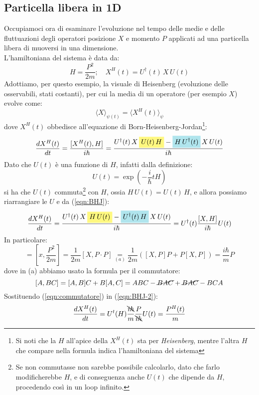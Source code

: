 \documentclass[../../FisicaTeorica.tex]{subfiles}
\begin{document}
\subsection{Particella libera in 1D}
Occupiamoci ora di esaminare l'evoluzione nel tempo delle medie e delle fluttuazioni degli operatori posizione $X$ e momento $P$ applicati ad una particella libera di muoversi in una dimensione.\\
L'hamiltoniana del sistema è data da:
\[
H=\frac{P^2}{2m};\quad X^H(t)=U^\dag(t)\,X\,U(t)
\]
Adottiamo, per questo esempio, la visuale di Heisenberg (evoluzione delle osservabili, stati costanti), per cui la media di un operatore (per esempio $X$) evolve come:
\[
\langle X \rangle_{\psi(t)}=\langle X^H(t)\rangle_\psi
\]
dove $X^H(t)$ obbedisce all'equazione di Born-Heisenberg-Jordan\footnote{Si noti che la $H$ all'apice della $X^H(t)$ sta per \textit{Heisenberg}, mentre l'altra $H$ che compare nella formula indica l'hamiltoniana del sistema}:
\begin{equation}
\frac{dX^H(t)}{dt}=\frac{[X^H(t),H]}{i\hbar} =
\frac{
U^\dag(t)\,X\,\hlc{Yellow}{U(t)\,H}-\hlc{SkyBlue}{H\,U^\dag(t)}\,X\,U(t)
}{i\hbar}
\label{eqn:BHJ}
\end{equation}
Dato che $U(t)$ è una funzione di $H$, infatti dalla definizione:
\[
U(t)=\exp\left(-\frac{i}{\hbar}tH\right)
\]
si ha che $U(t)$ commuta\footnote{Se non commutasse non sarebbe possibile calcolarlo, dato che farlo modificherebbe $H$, e di conseguenza anche $U(t)$ che dipende da $H$, procedendo così in un loop infinito.} con $H$, ossia $H\,U(t)=U(t)\,H$, e allora possiamo riarrangiare le $U$ e  da (\ref{eqn:BHJ}):
\begin{equation}
\frac{dX^H(t)}{dt}=\frac{U^\dag(t)\,X\,\hlc{Yellow}{H\,U(t)}-\hlc{SkyBlue}{U^\dag(t)\,H}\,X\,U(t)}{i\hbar} 
=U^\dag(t) \frac{[X,H]}{i\hbar}U(t)
\label{eqn:BHJ-2}
\end{equation}
In particolare:
\begin{equation}
[X,H]=\left[x,\frac{P^2}{2m}\right] = \frac{1}{2m}[X,P\cdot P]\underset{(a)}{=}\frac{1}{2m}([X,P]P+P[X,P])=\frac{i\hbar}{m}P
\label{eqn:commutatore}
\end{equation}
dove in (a) abbiamo usato la formula per il commutatore:
\[
[A,BC]=[A,B]C+B[A,C]=ABC-\cancel{BAC}+\cancel{BAC}-BCA
\]
Sostituendo (\ref{eqn:commutatore}) in (\ref{eqn:BHJ-2}):
\begin{equation}
\frac{dX^H(t)}{dt}
=U^t(H)\frac{\bcancel{i\hbar}}{m}\frac{P}{\bcancel{i\hbar}}U(t)=\frac{P^H(t)}{m}
\label{eqn:BHJ-3}
\end{equation}
\end{document}
